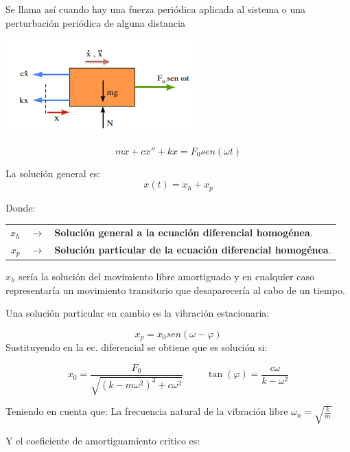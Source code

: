\documentclass[oneside,12pt]{report}
\begin{document}
Se llama así cuando hay una fuerza periódica aplicada al sistema o una perturbación periódica de alguna distancia
\begin{center}
	\includegraphics{imagen16}
\end{center}
\begin{equation}
	mx+cx''+kx=F_0sen (\omega t)
\end{equation}

La solución general es:
\begin{equation}
   x(t)=x_h+x_p
\end{equation}

Donde:  
\begin{center}	
\begin{tabular}{rcl}
 $x_h$&$\longrightarrow$& \textbf{Solución general a la ecuación diferencial homogénea}.\\[0.5cm]
$x_p$&$\longrightarrow$ &\textbf{Solución particular de la ecuación diferencial  homogénea}.
\end{tabular}
\end{center}


$x_h$ sería la solución del movimiento libre amortiguado y en cualquier caso representaría un movimiento transitorio que desaparecería al cabo de un tiempo.

Una solución particular en cambio es la vibración estacionaria:

\begin{equation}
	x_p=x_0sen(\omega -\varphi)
\end{equation}
Sustituyendo en la ec. diferencial se obtiene que es solución si:

\begin{equation}
	x_0=\frac{F_0}{\sqrt{(k-m\omega^{2})^{2}+c \omega^{2}}}\hspace{1cm}\tan(\varphi)=\frac{c \omega}{k-\omega^{2}}
\end{equation}

Teniendo en cuenta que:
La frecuencia natural de la vibración libre
$\omega_n= \sqrt{\frac{k}{m}}$

Y el coeficiente de amortiguamiento critico es:
\end{document}
